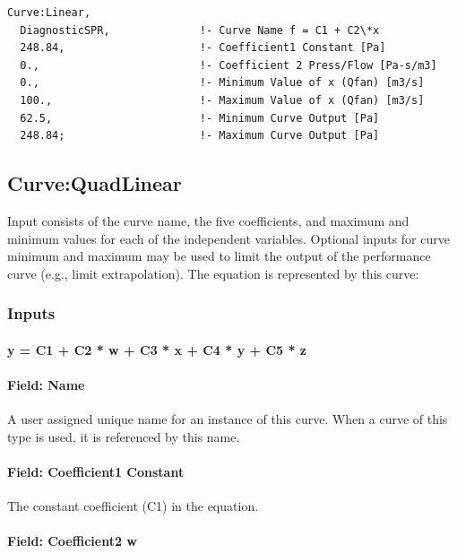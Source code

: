 \begin{lstlisting}
Curve:Linear,
  DiagnosticSPR,              !- Curve Name f = C1 + C2\*x
  248.84,                     !- Coefficient1 Constant [Pa]
  0.,                         !- Coefficient 2 Press/Flow [Pa-s/m3]
  0.,                         !- Minimum Value of x (Qfan) [m3/s]
  100.,                       !- Maximum Value of x (Qfan) [m3/s]
  62.5,                       !- Minimum Curve Output [Pa]
  248.84;                     !- Maximum Curve Output [Pa]
\end{lstlisting}

\subsection{Curve:QuadLinear}\label{curvequadlinear}

Input consists of the curve name, the five coefficients, and maximum and minimum values for each of the independent variables. Optional inputs for curve minimum and maximum may be used to limit the output of the performance curve (e.g., limit extrapolation). The equation is represented by this curve:

\subsubsection{Inputs}\label{inputs-1-028}

\paragraph{y = C1 + C2 * w + C3 * x + C4 * y + C5 * z}\label{y-c1-c2-w-c3-x-c4-y-c5-z}

\paragraph{Field: Name}\label{field-name-1-027}

A user assigned unique name for an instance of this curve. When a curve of this type is used, it is referenced by this name.

\paragraph{Field: Coefficient1 Constant}\label{field-coefficient1-constant-1}

The constant coefficient (C1) in the equation.

\paragraph{Field: Coefficient2 w}\label{field-coefficient2-w}

